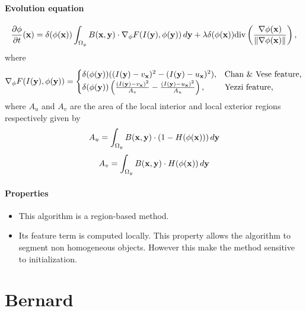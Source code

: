 \paragraph{Evolution equation}
\begin{equation}
	\label{eq:evol_lankton}
	\frac{\partial \phi}{\partial t}(\mathbf{x}) = \delta(\phi(\mathbf{x})) \int_{\Omega_y} B(\mathbf{x},\mathbf{y}) \cdot \nabla_\phi F(I(\mathbf{y}), \phi(\mathbf{y})) \, d\mathbf{y} + \lambda \delta(\phi(\mathbf{x})) \text{div}\left(\frac{\nabla \phi(\mathbf{x})}{\|\nabla \phi(\mathbf{x})\|}\right),
\end{equation}
where
\begin{equation}
	\label{eq:gradF_lankton}
	\nabla_\phi F(I(\mathbf{y}),\phi(\mathbf{y})) = 
	\begin{cases}
		\delta(\phi(\mathbf{y}))((I(\mathbf{y}) - v_\mathbf{x})^2 - (I(\mathbf{y}) - u_\mathbf{x})^2), & \text{Chan \& Vese feature,}\\
		\delta(\phi(\mathbf{y})) \left( \frac{(I(\mathbf{y}) - v_\mathbf{x})^2}{A_v} - \frac{(I(\mathbf{y}) - u_\mathbf{x})^2}{A_u}\right), & \text{Yezzi feature,}
	\end{cases}
\end{equation}
where $A_u$ and $A_v$ are the area of the local interior and local exterior regions respectively given by
\begin{equation}
	\label{eq:Au_lankton}
	A_u = \int_{\Omega_y} B(\mathbf{x},\mathbf{y}) \cdot (1 - H(\phi(\mathbf{x}))) \, d\mathbf{y}
\end{equation}
\begin{equation}
	\label{eq:Av_lankton}
	A_v = \int_{\Omega_y} B(\mathbf{x},\mathbf{y}) \cdot H(\phi(\mathbf{x})) \, d\mathbf{y}
\end{equation}

\paragraph{Properties}

\begin{itemize}
	\item This algorithm is a region-based method.
	\item Its feature term is computed locally. This property allows the algorithm to segment non homogeneous objects. However this make the method sensitive to initialization.
\end{itemize}


\newpage
\section[Bernard]{Bernard \cite{Bernard2009a}}
\label{sec:Bernard}

